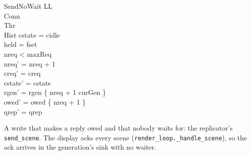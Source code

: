 \documentclass[a4paper,10pt,fleqn]{article}
\begin{document}
\begin{schema}{SendNoWait}
  \Delta LL \\
  \Xi Conn \\
  \Xi Thr \\
  \Xi Hist
\where
  cstate = cidle \\
  held = fset \\
  nreq < maxReq \\
  nreq' = nreq + 1 \\
  creq' = creq \\
  cstate' = cstate \\
  rgen' = rgen \oplus \{ nreq + 1 \mapsto curGen \} \\
  owed' = owed \cup \{ nreq + 1 \} \\
  qrep' = qrep
\end{schema}
A write that makes a reply owed and that nobody waits for: the replicator's \texttt{send\_scene}.  The display acks every scene (\texttt{render\_loop.\_handle\_scene}), so the ack arrives in the generation's sink with no waiter.
\end{document}
